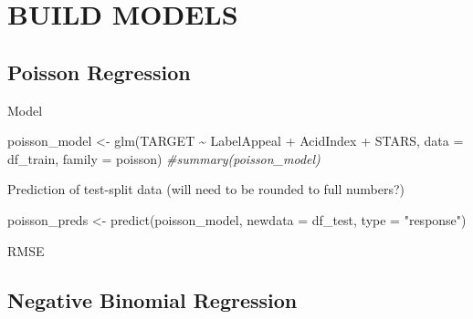 \documentclass[
]{article}
\newenvironment{Shaded}{\begin{snugshade}}{\end{snugshade}}
\newcommand{\AttributeTok}[1]{\textcolor[rgb]{0.77,0.63,0.00}{#1}}
\newcommand{\CommentTok}[1]{\textcolor[rgb]{0.56,0.35,0.01}{\textit{#1}}}
\newcommand{\DecValTok}[1]{\textcolor[rgb]{0.00,0.00,0.81}{#1}}
\newcommand{\FunctionTok}[1]{\textcolor[rgb]{0.00,0.00,0.00}{#1}}
\newcommand{\NormalTok}[1]{#1}
\newcommand{\OtherTok}[1]{\textcolor[rgb]{0.56,0.35,0.01}{#1}}
\newcommand{\SpecialCharTok}[1]{\textcolor[rgb]{0.00,0.00,0.00}{#1}}
\newcommand{\StringTok}[1]{\textcolor[rgb]{0.31,0.60,0.02}{#1}}
\begin{document}
\hypertarget{build-models}{%
\section{BUILD MODELS}\label{build-models}}

\hypertarget{poisson-regression}{%
\subsection{Poisson Regression}\label{poisson-regression}}

Model

\begin{Shaded}
\begin{Highlighting}[]
\NormalTok{poisson\_model }\OtherTok{\textless{}{-}} \FunctionTok{glm}\NormalTok{(TARGET }\SpecialCharTok{\textasciitilde{}}\NormalTok{ LabelAppeal }\SpecialCharTok{+}\NormalTok{ AcidIndex }\SpecialCharTok{+}\NormalTok{ STARS, }\AttributeTok{data =}\NormalTok{ df\_train, }\AttributeTok{family =}\NormalTok{ poisson)}
\CommentTok{\#summary(poisson\_model)}
\end{Highlighting}
\end{Shaded}

Prediction of test-split data (will need to be rounded to full numbers?)

\begin{Shaded}
\begin{Highlighting}[]
\NormalTok{poisson\_preds }\OtherTok{\textless{}{-}} \FunctionTok{predict}\NormalTok{(poisson\_model, }\AttributeTok{newdata =}\NormalTok{ df\_test, }\AttributeTok{type =} \StringTok{"response"}\NormalTok{)}
\end{Highlighting}
\end{Shaded}

RMSE

\begin{Shaded}
\end{Shaded}

\hypertarget{negative-binomial-regression}{%
\subsection{Negative Binomial
Regression}\label{negative-binomial-regression}}
\end{document}
